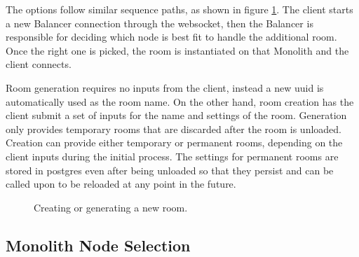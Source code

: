 The options follow similar sequence paths, as shown in figure \ref{Figure::create-room-diag}. The client starts a new Balancer connection through the websocket, then the Balancer is responsible for deciding which node is best fit to handle the additional room. Once the right one is picked, the room is instantiated on that Monolith and the client connects.

Room generation requires no inputs from the client, instead a new uuid is automatically used as the room name. On the other hand, room creation has the client submit a set of inputs for the name and settings of the room. Generation only provides temporary rooms that are discarded after the room is unloaded. Creation can provide either temporary or permanent rooms, depending on the client inputs during the initial process. The settings for permanent rooms are stored in postgres even after being unloaded so that they persist and can be called upon to be reloaded at any point in the future.

\begin{figure}[!htb]
  \centering
  \caption{\label{Figure::create-room-diag} Creating or generating a new room.}
\end{figure}

\subsection{Monolith Node Selection}

